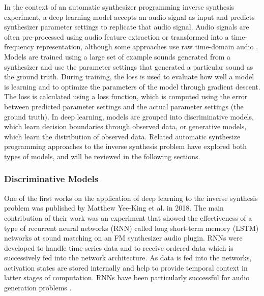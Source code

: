 In the context of an automatic synthesizer programming inverse synthesis experiment, a deep learning model accepts an audio signal as input and predicts synthesizer parameter settings to replicate that audio signal. Audio signals are often pre-processed using audio feature extraction or transformed into a time-frequency representation, although some approaches use raw time-domain audio \cite{barkan2019inversynth}. Models are trained using a large set of example sounds generated from a synthesizer and use the parameter settings that generated a particular sound as the ground truth. During training, the loss is used to evaluate how well a model is learning and to optimize the parameters of the model through gradient descent. The loss is calculated using a loss function, which is computed using the error between predicted parameter settings and the actual parameter settings (the ground truth). In deep learning, models are grouped into discriminative models, which learn decision boundaries through observed data, or generative models, which learn the distribution of observed data. Related automatic synthesize programming approaches to the inverse synthesis problem have explored both types of models, and will be reviewed in the following sections.

\subsubsection{Discriminative Models}
One of the first works on the application of deep learning to the inverse synthesis problem was published by Matthew Yee-King et al. \cite{yee2018automatic} in 2018. The main contribution of their work was an experiment that showed the effectiveness of a type of recurrent neural networks (RNN) called long short-term memory (LSTM) networks at sound matching on an FM synthesizer audio plugin. RNNs were developed to handle time-series data and to receive ordered data which is successively fed into the network architecture. As data is fed into the networks, activation states are stored internally and help to provide temporal context in latter stages of computation. RNNs have been particularly successful for audio generation problems \cite{oord2016wavenet, engel2017neural}. 

